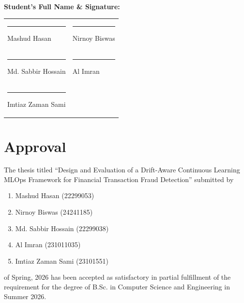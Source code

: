 \documentclass[11pt,letterpaper]{report}
\begin{document}
\textbf{Student's Full Name \& Signature:}\par\vspace{2.5em}
\begin{center}
\begin{tabular}{>{\centering\arraybackslash}p{}>{\centering\arraybackslash}p{}}
\rule{0.38\textwidth}{0.4pt}\newline Mashud Hasan\newline 22299053 & \rule{0.38\textwidth}{0.4pt}\newline Nirnoy Biswas\newline 24241185 \\[1.2em]
\rule{0.38\textwidth}{0.4pt}\newline Md. Sabbir Hossain\newline 22299038 & \rule{0.38\textwidth}{0.4pt}\newline Al Imran\newline 231011035 \\[1.2em]
\rule{0.38\textwidth}{0.4pt}\newline Imtiaz Zaman Sami\newline 23101551 &  \\[1.2em]
\end{tabular}
\end{center}

\chapter*{Approval}
The thesis titled ``Design and Evaluation of a Drift-Aware Continuous Learning MLOps Framework for Financial Transaction Fraud Detection'' submitted by
\begin{enumerate}
  \item Mashud Hasan (22299053)
  \item Nirnoy Biswas (24241185)
  \item Md. Sabbir Hossain (22299038)
  \item Al Imran (231011035)
  \item Imtiaz Zaman Sami (23101551)
\end{enumerate}
of Spring, 2026 has been accepted as satisfactory in partial fulfillment of the requirement for the degree of B.Sc. in Computer Science and Engineering in Summer 2026.
\end{document}
